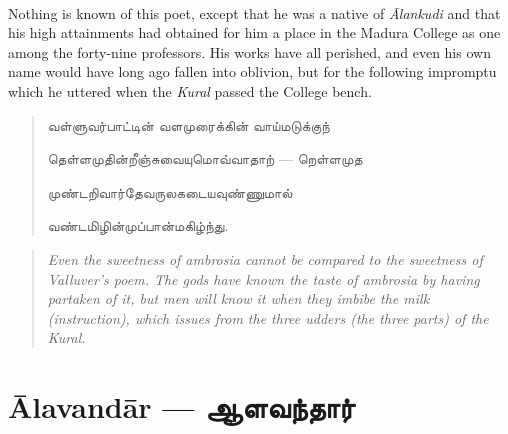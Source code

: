 \documentclass{article}
\newcommand{\TamilText}[1]{\texttamil{#1}}
\newcommand{\TamilBold}[1]{\texttamil{\textbf{#1}}}
\newcommand{\tam}[1]{\TamilText{#1}}
\newcommand{\tambold}[1]{\TamilBold{#1}}
\begin{document}
\paragraph{}
Nothing is known of this poet, except that he was a native of \emph{\={A}lankudi} and that his high attainments had obtained for him a place in the Madura College as one among the forty-nine professors. His works have all perished, and even his own name would have long ago fallen into oblivion, but for the following impromptu which he uttered when the \emph{Kural} passed the College bench.
\begin{quotation}\small
\tam{வள்ளுவர்பாட்டின்‌ வளமுரைக்கின்‌ வாய்மடுக்குந்}

\tam{தெள்ளமுதின்றீஞ்சுவையுமொவ்வாதாற்‌} --- \tam{றெள்ளமுத}

\tam{முண்டறிவார்தேவருலகடையவுண்ணுமால்‌}

\tam{வண்டமிழின்முப்பான்மகிழ்ந்து}.
\end{quotation}
\begin{quotation}\small
\emph{Even the sweetness of ambrosia cannot be compared to the sweetness of Valluver's poem. The gods have known the taste of ambrosia by having partaken of it, but men will know it when they imbibe the milk (instruction), which issues from the three udders (the three parts) of the Kural.}
\end{quotation}

\section{\={A}lavand\={a}r --- \tambold{ஆளவந்தார்}}
\end{document}
